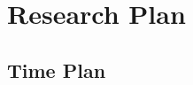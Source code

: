 
\chapter{Research Plan}
\label{chap:research_plan}

\begingroup
\small
\setlength{\tabcolsep}{2.6pt}
\renewcommand{\arraystretch}{1.08}
\newcommand{\planfilled}{\cellcolor{planfill}\rule{0pt}{1.7ex}}
\newcommand{\planempty}{\rule{0pt}{1.7ex}}

\section{Time Plan}
\vspace{-0.45em}
